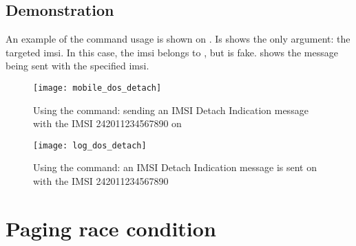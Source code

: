       \subsection{Demonstration}

      An example of the  command usage is shown on
      . Is shows the only argument: the
      targeted \gls{imsi}. In this case, the \gls{imsi} belongs to
      , but is fake.  shows
      the message being sent with the specified \gls{imsi}.

      \begin{figure}
        \centering
        \texttt{[image: mobile\_dos\_detach]}
        \caption{Using the  command: sending an IMSI
        Detach Indication message with the IMSI 242011234567890 on
      }
        \label{fig:mobile_dos_detach}
      \end{figure}

      \begin{figure}
        \centering
        \texttt{[image: log\_dos\_detach]}
        \caption{Using the  command: an IMSI
          Detach Indication message is sent on  with the IMSI 242011234567890}
        \label{fig:mobile_dos_detach}
      \end{figure}

      \iffalse
      \begin{figure}[h]
        \centering
        \texttt{[image: log\_dos\_detach1]}
        \caption{Using the \prog{dos detach} command: to send an IMSI
        Detach Indication message with the IMSI 242011234567890 on
      \comp{Telenor}. In Wireshark.}
        \label{fig:mobile_dos_detach1}
      \end{figure}

      \begin{figure}[h]
        \centering
        \texttt{[image: log\_dos\_detach2]}
        \caption{Can see the message being sent, and the connection being
        established. l1ctl is shown before gsm48 but sent before.}
        \label{fig:mobile_dos_detach2}
      \end{figure}
      \fi


    \section{Paging race condition}


